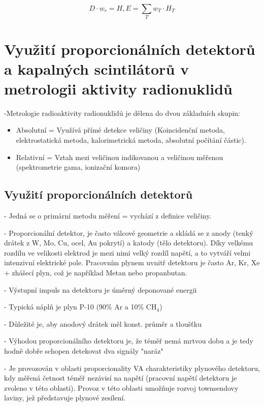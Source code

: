 \begin{center}
    \begin{equation}
        D \cdot w_r = H, E = \sum_T w_T \cdot H_T
    \end{equation}
\end{center}

\newpage
\section{Využití proporcionálních detektorů a kapalných scintilátorů v metrologii aktivity radionuklidů}

-Metrologie radioaktivity radionuklidů je dělena do dvou základních skupin:

\begin{itemize}
    \item Absolutní = Využívá přímé detekce veličiny (Koincidenční metoda, elektrostatická metoda, kalorimetrická metoda, absolutní počítání částic).
    \item Relativní = Vztah mezi veličinou indikovanou a veličinou měřenou (spektrometrie gama, ionizační komora)
\end{itemize}

\subsection{Využití proporcionálních detektorů}

- Jedná se o primární metodu měření = vychází z definice veličiny.

- Proporcionální detektor, je často válcové geometrie a skládá se z anody (tenký drátek z W, Mo, Cu, ocel, Au pokrytí) a katody (tělo detektoru). Díky velkému rozdílu ve velikosti elektrod je mezi nimi velký rozdíl napětí, a to vytváří velmi intenzivní elektrické pole. Pracovním plynem uvnitř detektoru je často Ar, Kr, Xe + zhášecí plyn, což je například Metan nebo propanbutan.

- Výstupní impuls na detektoru je úměrný deponované energii

- Typická náplň je plyn P-10 (90\% Ar a 10\% CH$_4$)

- Důležité je, aby anodový drátek měl konst. průměr a tloušťku

- Výhodou proporcionálního detektoru je, že téměř nemá mrtvou dobu a je tedy hodně dobře schopen detekovat dva signály "naráz"

- Je provozován v oblasti proporcionality VA charakteristiky plynového detektoru, kdy měřená četnost téměř nezávisí na napětí (pracovní napětí detektoru je zvoleno v této oblasti). Provoz v této oblasti umožňuje rozvoj townsendovy laviny, jež představuje plynové zesílení.

